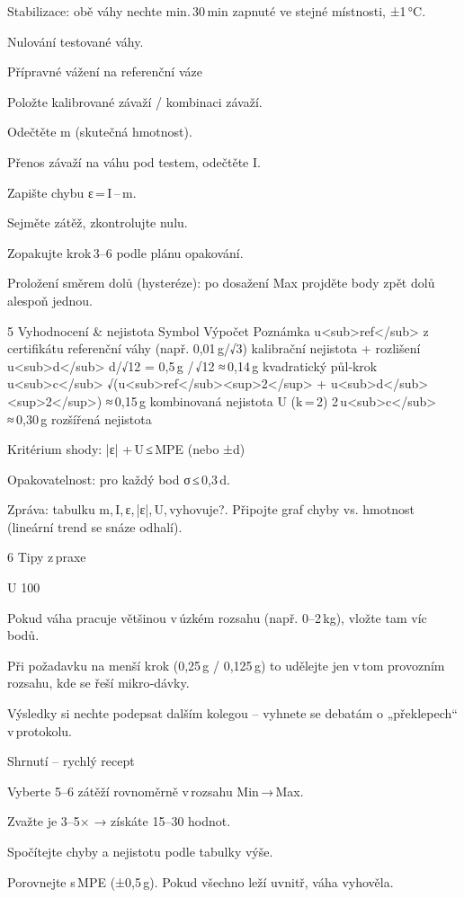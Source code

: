     Stabilizace: obě váhy nechte min. 30 min zapnuté ve stejné místnosti, ±1 °C.

    Nulování testované váhy.

    Přípravné vážení na referenční váze

        Položte kalibrované závaží / kombinaci závaží.

        Odečtěte m (skutečná hmotnost).

    Přenos závaží na váhu pod testem, odečtěte I.

    Zapište chybu ε = I – m.

    Sejměte zátěž, zkontrolujte nulu.

    Zopakujte krok 3–6 podle plánu opakování.

    Proložení směrem dolů (hysteréze): po dosažení Max projděte body zpět dolů alespoň jednou.

5  Vyhodnocení & nejistota
Symbol	Výpočet	Poznámka
u<sub>ref</sub>	z certifikátu referenční váhy (např. 0,01 g/√3)	kalibrační nejistota + rozlišení
u<sub>d</sub>	d/√12 = 0,5 g / √12 ≈ 0,14 g	kvadratický půl‑krok
u<sub>c</sub>	√(u<sub>ref</sub><sup>2</sup> + u<sub>d</sub><sup>2</sup>) ≈ 0,15 g	kombinovaná nejistota
U (k = 2)	2 u<sub>c</sub> ≈ 0,30 g	rozšířená nejistota

    Kritérium shody: |ε| + U ≤ MPE (nebo ±d)

    Opakovatelnost: pro každý bod σ ≤ 0,3 d.

    Zpráva: tabulku m, I, ε, |ε|, U, vyhovuje?. Připojte graf chyby vs. hmotnost (lineární trend se snáze odhalí).

6  Tipy z praxe

    U 100 %

    Pokud váha pracuje většinou v úzkém rozsahu (např. 0–2 kg), vložte tam víc bodů.

    Při požadavku na menší krok (0,25 g / 0,125 g) to udělejte jen v tom provozním rozsahu, kde se řeší mikro‑dávky.

    Výsledky si nechte podepsat dalším kolegou – vyhnete se debatám o „překlepech“ v protokolu.

Shrnutí – rychlý recept

    Vyberte 5–6 zátěží rovnoměrně v rozsahu Min → Max.

    Zvažte je 3–5× → získáte 15–30 hodnot.

    Spočítejte chyby a nejistotu podle tabulky výše.

    Porovnejte s MPE (±0,5 g). Pokud všechno leží uvnitř, váha vyhověla.


